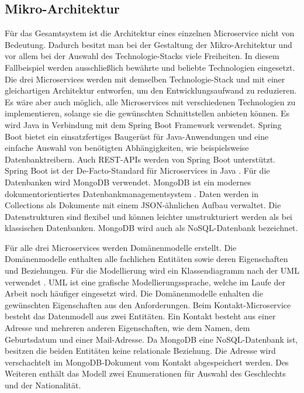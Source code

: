 \subsection{Mikro-Architektur}
Für das Gesamtsystem ist die Architektur eines einzelnen Microservice nicht von Bedeutung. Dadurch besitzt man bei der Gestaltung der Mikro-Architektur und vor allem bei der Auswahl des Technologie-Stacks viele Freiheiten. In diesem Fallbeispiel werden ausschließlich bewährte und beliebte Technologien eingesetzt. Die drei Microservices werden mit demselben Technologie-Stack und mit einer gleichartigen Architektur entworfen, um den Entwicklungsaufwand zu reduzieren. Es wäre aber auch möglich, alle Microservices mit verschiedenen Technologien zu implementieren, solange sie die gewünschten Schnittstellen anbieten können. Es wird Java in Verbindung mit dem Spring Boot Framework verwendet. Spring Boot bietet ein einsatzfertiges Baugerüst für Java-Anwendungen und eine einfache Auswahl von benötigten Abhängigkeiten, wie beispielsweise Datenbanktreibern. Auch \ac{REST}-\acp{API} werden von Spring Boot unterstützt. Spring Boot ist der De-Facto-Standard für Microservices in Java \parencite[vgl.][]{vmwareinc.Spring2022}. Für die Datenbanken wird MongoDB verwendet. MongoDB ist ein modernes dokumentorientiertes Datenbankmanagementsystem  \parencite[vgl.][]{mongodbinc.MongoDB2022}. Daten werden in Collections als Dokumente mit einem \ac{JSON}-ähnlichen Aufbau verwaltet. Die Datenstrukturen sind flexibel und können leichter umstrukturiert werden als bei klassischen Datenbanken. MongoDB wird auch als NoSQL-Datenbank bezeichnet.

Für alle drei Microservices werden Domänenmodelle erstellt. Die Domänenmodelle enthalten alle fachlichen Entitäten sowie deren Eigenschaften und Beziehungen. Für die Modellierung wird ein Klassendiagramm nach der \ac{UML} verwendet \parencite[vgl.][]{Unified2017}. \ac{UML} ist eine grafische Modellierungssprache, welche im Laufe der Arbeit noch häufiger eingesetzt wird. Die Domänenmodelle enhalten die gewünschten Eigenschaften aus den Anforderungen. Beim Kontakt-Microservice besteht das Datenmodell aus zwei Entitäten. Ein Kontakt besteht aus einer Adresse und mehreren anderen Eigenschaften, wie dem Namen, dem Geburtsdatum und einer Mail-Adresse. Da MongoDB eine NoSQL-Datenbank ist, besitzen die beiden Entitäten keine relationale Beziehung. Die Adresse wird verschachtelt im MongoDB-Dokument vom Kontakt abgespeichert werden. Des Weiteren enthält das Modell zwei Enumerationen für Auswahl des Geschlechts und der Nationalität.

